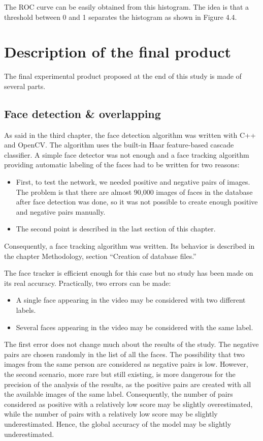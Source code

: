 The ROC curve can be easily obtained from this histogram. The idea is that a threshold between 0 and 1 separates the histogram as shown in Figure 4.4.

\section{Description of the final product}

The final experimental product proposed at the end of this study is made of several parts.

\subsection{Face detection & overlapping}
As said in the third chapter, the face detection algorithm was written with C++ and OpenCV. The algorithm uses the built-in Haar feature-based cascade classifier. A simple face detector was not enough and a face tracking algorithm providing automatic labeling of the faces had to be written for two reasons:
\begin{itemize}
\item First, to test the network, we needed positive and negative pairs of images. The problem is that there are almost 90,000 images of faces in the database after face detection was done, so it was not possible to create enough positive and negative pairs manually.
\item The second point is described in the last section of this chapter.
\end{itemize}
Consequently, a face tracking algorithm was written. Its behavior is described in the chapter Methodology, section \enquote{Creation of database files.}

The face tracker is efficient enough for this case but no study has been made on its real accuracy. Practically, two errors can be made:
\begin{itemize}
\item A single face appearing in the video may be considered with two different labels.
\item Several faces appearing in the video may be considered with the same label.
\end{itemize}

The first error does not change much about the results of the study. The negative pairs are chosen randomly in the list of all the faces. The possibility that two images from the same person are considered as negative pairs is low. However, the second scenario, more rare but still existing, is more dangerous for the precision of the analysis of the results, as the positive pairs are created with all the available images of the same label. Consequently, the number of pairs considered as positive with a relatively low score may be slightly overestimated, while the number of pairs with a relatively low score may be slightly underestimated. Hence, the global accuracy of the model may be slightly underestimated.

